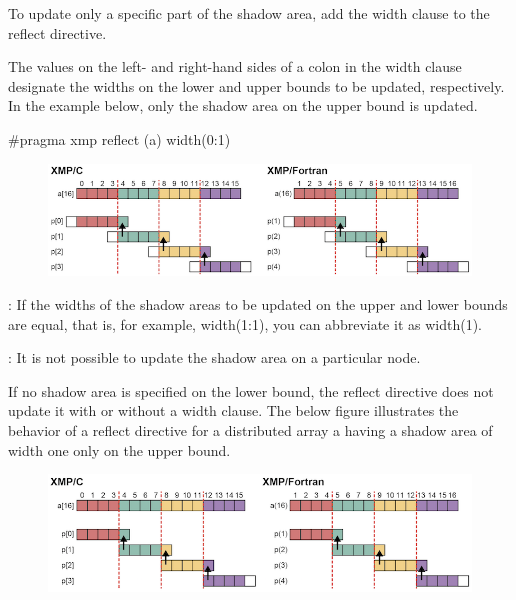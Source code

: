 To update only a specific part of the shadow area, add the width clause
to the reflect directive.

The values on the left- and right-hand sides of a colon in the width
clause designate the widths on the lower and upper bounds to be updated,
respectively. In the example below, only the shadow area on the upper
bound is updated.

\begin{XCexample}
#pragma xmp reflect (a) width(0:1)
\end{XCexample}


\begin{figure}
  \centering
  \includegraphics{figs/reflect_width.png}
\end{figure}

\noindent\hrulefill

: If the widths of the shadow areas to be updated on
the upper and lower 
bounds are equal, that is, for example, width(1:1), you can abbreviate
it as width(1).

\noindent\hrulefill

\noindent\hrulefill

: It is not possible to update the shadow area on a
particular node. 

\noindent\hrulefill

If no shadow area is specified on the lower bound, the reflect directive
does not update it with or without a width clause. The below figure
illustrates the behavior of a reflect directive for a distributed array
a having a shadow area of width one only on the upper bound.

\begin{figure}
  \centering
  \includegraphics{figs/reflect_uneven.png}
\end{figure}


